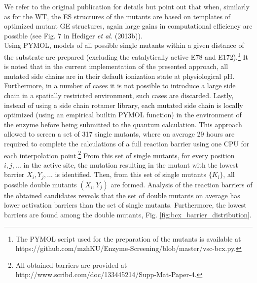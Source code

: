 We refer to the original publication for details\cite{hediger2013computational} but point out that when, similarly as for the WT, the ES structures of the mutants are based on templates of optimized mutant GE structures, again large gains in computational efficiency are possible (see Fig. 7 in Hediger \textit{et al.} (2013b)).\\
Using PYMOL\cite{PyMOLu}, models of all possible single mutants within a given distance of the substrate are prepared (excluding the catalytically active E78 and E172).\footnote{The PYMOL script used for the preparation of the mutants is available at https://github.com/mzhKU/Enzyme-Screening/blob/master/vsc-bcx.py.}
It is noted that in the current implementation of the presented approach, all mutated side chains are in their default ionization state at physiological pH.
Furthermore, in a number of cases it is not possible to introduce a large side chain in a spatially restricted environment, such cases are discarded.
Lastly, instead of using a side chain rotamer library, each mutated side chain is locally optimized (using an empirical builtin PYMOL function) in the environment of the enzyme before being submitted to the quantum calculation.
This approach allowed to screen a set of 317 single mutants, where on average 29 hours are required to complete the calculations of a full reaction barrier using one CPU for each interpolation point.\footnote{All obtained barriers are provided at http://www.scribd.com/doc/133445214/Supp-Mat-Paper-4.}
From this set of single mutants, for every position $i, j, ...$ in the active site, the mutation resulting in the mutant with the lowest barrier $X_i, Y_j, ...$ is identified.
Then, from this set of single mutants $\{K_l\}$, all possible double mutants $(X_i, Y_j)$ are formed.
Analysis of the reaction barriers of the obtained candidates reveals that the set of double mutants on average has lower activation barriers than the set of single mutants.
Furthermore, the lowest barriers are found among the double mutants, Fig. \ref{fig:bcx_barrier_distribution}.
